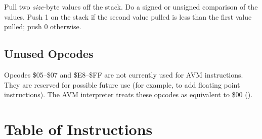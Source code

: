\documentclass[10pt]{article}
\begin{document}
 Pull two
\emph{size}-byte values off the stack. Do a signed or unsigned
comparison of the values.  Push 1 on the stack if the second value
pulled is less than the first value pulled; push 0 otherwise.

\subsection{Unused Opcodes}

Opcodes \$05--\$07 and \$E8--\$FF are not currently used for AVM
instructions.  They are reserved for possible future use (for example,
to add floating point instructions).  The AVM interpreter treats these
opcodes as equivalent to \$00 ().

\newpage

\section{Table of Instructions}
\end{document}
